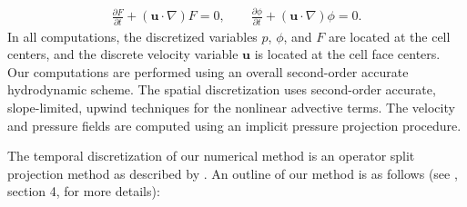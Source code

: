 \documentclass{elsarticle}
\newcommand{\vv}{\mathbf}
\newcommand{\bmu}{\vv{u}}
\begin{document}
%
\begin{align}\label{eq:clsvof}
  \frac{\partial F}{\partial t}+(\bmu\cdot\nabla)F = 0, \qquad 
  \frac{\partial \phi}{\partial t}+(\bmu\cdot\nabla)\phi = 0. 
\end{align}
%
In all computations, the discretized variables $p$, $\phi$, and $F$ are located at the cell centers, and the discrete velocity variable $\bmu$ is located at the cell face centers.  Our computations are performed using an overall second-order accurate hydrodynamic scheme.  The spatial discretization uses second-order accurate, slope-limited, upwind techniques for the nonlinear advective terms.  The velocity and pressure fields are computed using an implicit pressure projection procedure.
\par
The temporal discretization of our numerical method is an operator split projection method as described by \citet{SusSmiHusOhtZhi07}.  An outline of our method is as follows (see \citet{SusSmiHusOhtZhi07}, section 4, for more details):
\end{document}

